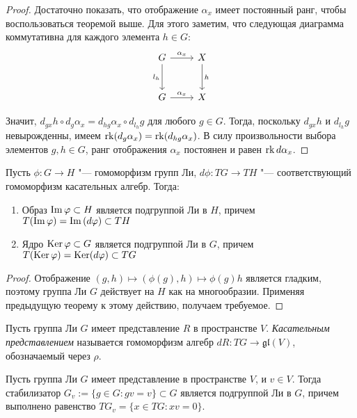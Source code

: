 \begin{proof}
	Достаточно показать, что отображение $\alpha_x$ имеет постоянный ранг, чтобы воспользоваться теоремой выше. Для этого заметим, что следующая диаграмма коммутативна для каждого элемента $h \in G$:
	\[
	\begin{tikzcd}[row sep = large]
		G \arrow[swap]{d}{l_{h}} \arrow{r}{\alpha_x} & X \arrow{d}{h}\\
		G \arrow{r}{\alpha_x} & X
	\end{tikzcd}
	\]
	
	Значит, $d_{gx}h \circ d_g{\alpha_x} = d_{hg}{\alpha_x} \circ d_{l_{h}}g$ для любого $g \in G$. Тогда, поскольку $d_{gx}h$ и $d_{l_{h}}g$ невырожденны, имеем $\operatorname{rk} (d_g{\alpha_x}) = \operatorname{rk} (d_{hg}{\alpha_x})$. В силу произвольности выбора элементов $g, h \in G$, ранг отображения $\alpha_x$ постоянен и равен $\operatorname{rk} d{\alpha_x}$.
\end{proof}

\begin{corollary}
	Пусть $\phi: G \to H$ "--- гомоморфизм групп Ли, $d\phi: TG \to TH$ "--- соответствующий гомоморфизм касательных алгебр. Тогда:
	\begin{enumerate}
		\item Образ $\operatorname{Im}\varphi \subset H$ является подгруппой Ли в $H$, причем $T(\operatorname{Im}\varphi) = \operatorname{Im}{(d\varphi)} \subset TH$
		\item Ядро $\operatorname{Ker}\varphi \subset G$ является подгруппой Ли в $G$, причем $T(\operatorname{Ker}\varphi) = \operatorname{Ker}(d\varphi) \subset TG$
	\end{enumerate}
\end{corollary}

\begin{proof}
	Отображение $(g, h) \mapsto (\phi(g), h) \mapsto \phi(g)h$ является гладким, поэтому группа Ли $G$ действует на $H$ как на многообразии. Применяя предыдущую теорему к этому действию, получаем требуемое.
\end{proof}

\begin{definition}
	Пусть группа Ли $G$ имеет представление $R$ в пространстве $V$. \textit{Касательным представлением} называется гомоморфизм алгебр $dR : TG \to \mathfrak{gl}(V)$, обозначаемый через $\rho$.
\end{definition}

\begin{corollary}
	Пусть группа Ли $G$ имеет представление в пространстве $V$, и $v \in V$. Тогда стабилизатор $G_v := \{g \in G: gv = v\} \subset G$ является подгруппой Ли в $G$, причем выполнено равенство $TG_v = \{x \in TG: xv = 0\}$.
\end{corollary}

